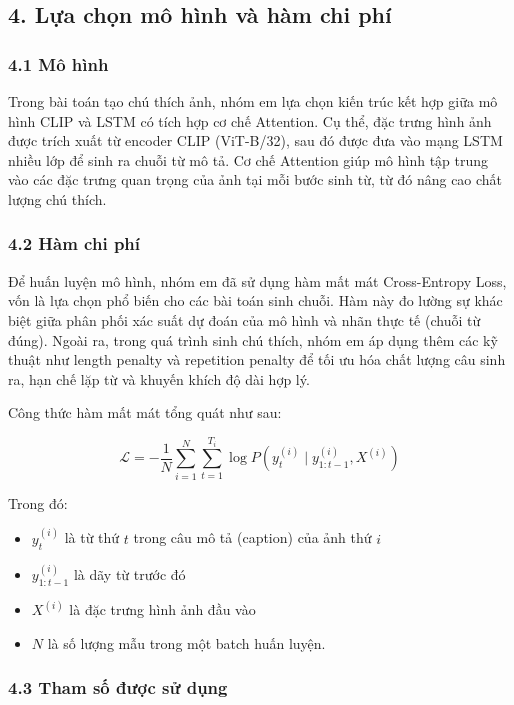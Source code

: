 \documentclass[../main.tex]{subfiles}
\begin{document}
\subsection*{4. Lựa chọn mô hình và hàm chi phí}

\subsubsection*{4.1 Mô hình}

Trong bài toán tạo chú thích ảnh, nhóm em lựa chọn kiến trúc kết hợp giữa mô hình CLIP và LSTM có tích hợp cơ chế Attention. Cụ thể, đặc trưng hình ảnh được trích xuất từ encoder CLIP (ViT-B/32), sau đó được đưa vào mạng LSTM nhiều lớp để sinh ra chuỗi từ mô tả. Cơ chế Attention giúp mô hình tập trung vào các đặc trưng quan trọng của ảnh tại mỗi bước sinh từ, từ đó nâng cao chất lượng chú thích.

\subsubsection*{4.2 Hàm chi phí}
Để huấn luyện mô hình, nhóm em đã sử dụng hàm mất mát Cross-Entropy Loss, vốn là lựa chọn phổ biến cho các bài toán sinh chuỗi. Hàm này đo lường sự khác biệt giữa phân phối xác suất dự đoán của mô hình và nhãn thực tế (chuỗi từ đúng). Ngoài ra, trong quá trình sinh chú thích, nhóm em áp dụng thêm các kỹ thuật như length penalty và repetition penalty để tối ưu hóa chất lượng câu sinh ra, hạn chế lặp từ và khuyến khích độ dài hợp lý.

Công thức hàm mất mát tổng quát như sau:

$$
\mathcal{L} = -\frac{1}{N} \sum_{i=1}^N \sum_{t=1}^{T_i} \log P(y_t^{(i)} \mid y_{1:t-1}^{(i)}, X^{(i)})
$$

Trong đó:
\begin{itemize}
    \item $y_t^{(i)}$ là từ thứ $t$ trong câu mô tả (caption) của ảnh thứ $i$
    \item $y_{1:t-1}^{(i)}$ là dãy từ trước đó
    \item $X^{(i)}$ là đặc trưng hình ảnh đầu vào
    \item $N$ là số lượng mẫu trong một batch huấn luyện.
\end{itemize}

\subsubsection*{4.3 Tham số được sử dụng}
\end{document}
